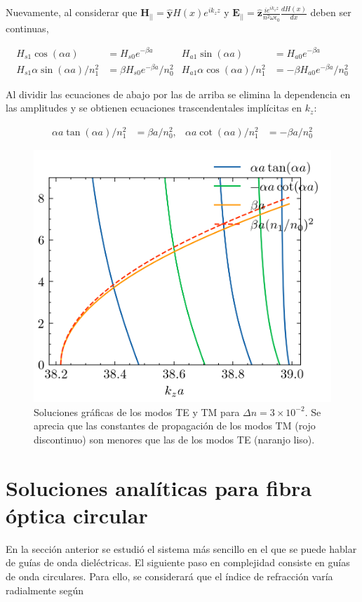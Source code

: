 Nuevamente, al considerar que $\textbf{H}_{||}= \mathbf{\hat{y}} H(x)e^{i k_z z }$ y $\textbf{E}_{||} = \mathbf{\hat{z}} \frac{ie^{i k_z z }}{n^2 \omega \epsilon_0} \frac{d H(x)}{dx}$ deben ser continuas, 

\begin{align*}
H_{s1}\cos(\alpha a) &= H_{s0} e^{-\beta a} & H_{a1}\sin(\alpha a) &= H_{a0} e^{-\beta a}
\\
H_{s1}\alpha\sin(\alpha a)/n_1^2 &= \beta H_{s0} e^{-\beta a}/n_0^2 & H_{a1}\alpha\cos(\alpha a)/n_1^2 &= -\beta H_{a0} e^{-\beta a}/n_0^2
\end{align*}

Al dividir las ecuaciones de abajo por las de arriba se elimina la dependencia en las amplitudes y se obtienen ecuaciones trascendentales implícitas en $k_z$:

\begin{align}
	\alpha a \tan(\alpha a)/n_1^2 &= \beta a/n_0^2, & \alpha a \cot(\alpha a)/n_1^2 &= -\beta a/n_0^2 \label{eqn:trascendentalTM}
\end{align}


\begin{figure}[H]
	\centering
	\includegraphics[width=0.7\linewidth]{media/slabgraphicalTETM1}
	\caption[Soluciones gráficas de los modos TE y TM]{Soluciones gráficas de los modos TE y TM para $\Delta n = 3\times 10^{-2}$. Se aprecia que las constantes de propagación de los modos TM (rojo discontinuo) son menores que las de los modos TE (naranjo liso).}
\end{figure}
\section{Soluciones analíticas para fibra óptica circular}
En la sección anterior se estudió el sistema más sencillo en el que se puede hablar de guías de onda dieléctricas. El siguiente paso en complejidad consiste en guías de onda circulares. Para ello, se considerará que el índice de refracción varía radialmente según 

